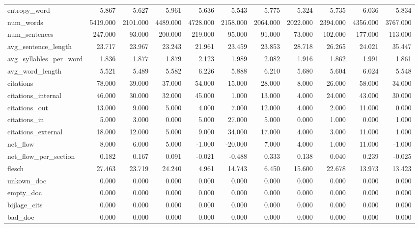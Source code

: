 \begin{tabular}{lrrrrrrrrrr}
\cline{1-11}
entropy\_word & 5.867 & 5.627 & 5.961 & 5.636 & 5.543 & 5.775 & 5.324 & 5.735 & 6.036 & 5.834 \\
\cline{1-11}
num\_words & 5419.000 & 2101.000 & 4489.000 & 4728.000 & 2158.000 & 2064.000 & 2022.000 & 2394.000 & 4356.000 & 3767.000 \\
\cline{1-11}
num\_sentences & 247.000 & 93.000 & 200.000 & 219.000 & 95.000 & 91.000 & 73.000 & 102.000 & 177.000 & 113.000 \\
\cline{1-11}
avg\_sentence\_length & 23.717 & 23.967 & 23.243 & 21.961 & 23.459 & 23.853 & 28.718 & 26.265 & 24.021 & 35.447 \\
\cline{1-11}
avg\_syllables\_per\_word & 1.836 & 1.877 & 1.879 & 2.123 & 1.989 & 2.082 & 1.916 & 1.862 & 1.991 & 1.861 \\
\cline{1-11}
avg\_word\_length & 5.521 & 5.489 & 5.582 & 6.226 & 5.888 & 6.210 & 5.680 & 5.604 & 6.024 & 5.548 \\
\cline{1-11}
citations & 78.000 & 39.000 & 37.000 & 54.000 & 15.000 & 28.000 & 8.000 & 26.000 & 58.000 & 34.000 \\
\cline{1-11}
citations\_internal & 46.000 & 30.000 & 32.000 & 45.000 & 1.000 & 13.000 & 4.000 & 24.000 & 43.000 & 30.000 \\
\cline{1-11}
citations\_out & 13.000 & 9.000 & 5.000 & 4.000 & 7.000 & 12.000 & 4.000 & 2.000 & 11.000 & 0.000 \\
\cline{1-11}
citations\_in & 5.000 & 3.000 & 0.000 & 5.000 & 27.000 & 5.000 & 0.000 & 1.000 & 0.000 & 1.000 \\
\cline{1-11}
citations\_external & 18.000 & 12.000 & 5.000 & 9.000 & 34.000 & 17.000 & 4.000 & 3.000 & 11.000 & 1.000 \\
\cline{1-11}
net\_flow & 8.000 & 6.000 & 5.000 & -1.000 & -20.000 & 7.000 & 4.000 & 1.000 & 11.000 & -1.000 \\
\cline{1-11}
net\_flow\_per\_section & 0.182 & 0.167 & 0.091 & -0.021 & -0.488 & 0.333 & 0.138 & 0.040 & 0.239 & -0.025 \\
\cline{1-11}
flesch & 27.463 & 23.719 & 24.240 & 4.961 & 14.743 & 6.450 & 15.600 & 22.678 & 13.973 & 13.423 \\
\cline{1-11}
unkown\_doc & 0.000 & 0.000 & 0.000 & 0.000 & 0.000 & 0.000 & 0.000 & 0.000 & 0.000 & 0.000 \\
\cline{1-11}
empty\_doc & 0.000 & 0.000 & 0.000 & 0.000 & 0.000 & 0.000 & 0.000 & 0.000 & 0.000 & 0.000 \\
\cline{1-11}
bijlage\_cits & 0.000 & 0.000 & 0.000 & 0.000 & 0.000 & 0.000 & 0.000 & 0.000 & 0.000 & 0.000 \\
\cline{1-11}
bad\_doc & 0.000 & 0.000 & 0.000 & 0.000 & 0.000 & 0.000 & 0.000 & 0.000 & 0.000 & 0.000 \\
\cline{1-11}
\bottomrule
\end{tabular}
